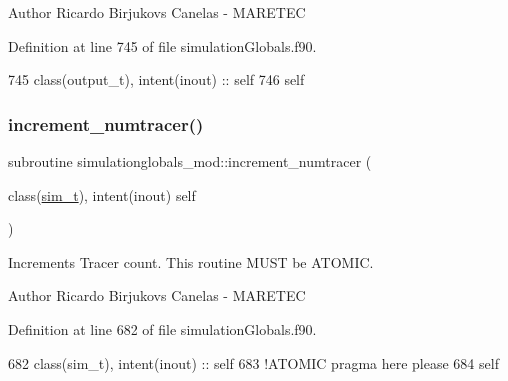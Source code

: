 \begin{DoxyAuthor}{Author}
Ricardo Birjukovs Canelas -\/ M\+A\+R\+E\+T\+EC 
\end{DoxyAuthor}


Definition at line 745 of file simulation\+Globals.\+f90.


\begin{DoxyCode}
745     \textcolor{keywordtype}{class}(output\_t), \textcolor{keywordtype}{intent(inout)} :: self
746     self%
\end{DoxyCode}
\mbox{\label{namespacesimulationglobals__mod_a3f11ed9f7735018950e1921ead871269}} 
\subsubsection{\texorpdfstring{increment\+\_\+numtracer()}{increment\_numtracer()}}
{\footnotesize\ttfamily subroutine simulationglobals\+\_\+mod\+::increment\+\_\+numtracer (\begin{DoxyParamCaption}\item[{class(\mbox{\hyperlink{structsimulationglobals__mod_1_1sim__t}{sim\+\_\+t}}), intent(inout)}]{self }\end{DoxyParamCaption})\hspace{0.3cm}{\ttfamily [private]}}



Increments Tracer count. This routine M\+U\+ST be A\+T\+O\+M\+IC. 

\begin{DoxyAuthor}{Author}
Ricardo Birjukovs Canelas -\/ M\+A\+R\+E\+T\+EC 
\end{DoxyAuthor}


Definition at line 682 of file simulation\+Globals.\+f90.


\begin{DoxyCode}
682     \textcolor{keywordtype}{class}(sim\_t), \textcolor{keywordtype}{intent(inout)} :: self
683     \textcolor{comment}{!ATOMIC pragma here please}
684     self%
\end{DoxyCode}
\mbox{\label{namespacesimulationglobals__mod_a17dc711ec02d5aea0c33006939da8dec}} 
